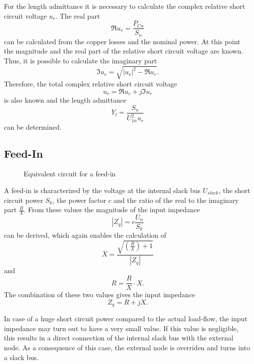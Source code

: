 For the length admittance it is necessary to calculate the complex relative short circuit voltage $u_r$. The real part
\begin{equation}
	\Re{u_r} = \frac{P_{Cu}}{S_n}
\end{equation}
can be calculated from the copper losses and the nominal power. At this point the magnitude and the real part of the relative short circuit voltage are known. Thus, it is possible to calculate the imaginary part
\begin{equation}
	\Im{u_r} = \sqrt{|u_r|^2 - \Re{u_r}}.
\end{equation}
Therefore, the total complex relative short circuit voltage
\begin{equation}
	u_r = \Re{u_r} + j \Im{u_r}
\end{equation}
is also known and the length admittance
\begin{equation}
	Y_l = \frac{S_n}{U_{1n}^2 u_r}
\end{equation}
can be determined.

\subsection{Feed-In}

\begin{figure}
	\centering
	
	\caption{Equivalent circuit for a feed-in}
	\label{fig:feedin}
\end{figure}

A feed-in  is characterized by the voltage at the internal slack bus $U_{slack}$, the short circuit power $S_k$, the power factor $c$ and the ratio of the real to the imaginary part $\frac{R}{X}$. From these values the magnitude of the input impedance 
\begin{equation}
	|Z_q| = c \frac{U_n}{S_k}
\end{equation}
can be derived, which again enables the calculation of
\begin{equation}
	X = \frac{\sqrt{\left( \frac{R}{X} \right) + 1}}{|Z_q|}
\end{equation}
and
\begin{equation}
	R = \frac{R}{X} \cdot X.
\end{equation}
The combination of these two values gives the input impedance
\begin{equation}
	Z_q = R + j X.
\end{equation}

In case of a huge short circuit power compared to the actual load-flow, the input impedance may turn out to have a very small value. If this value is negligible, this results in a direct connection of the internal slack bus with the external node. As a consequence of this case, the external node is overriden and turns into a slack bus.

